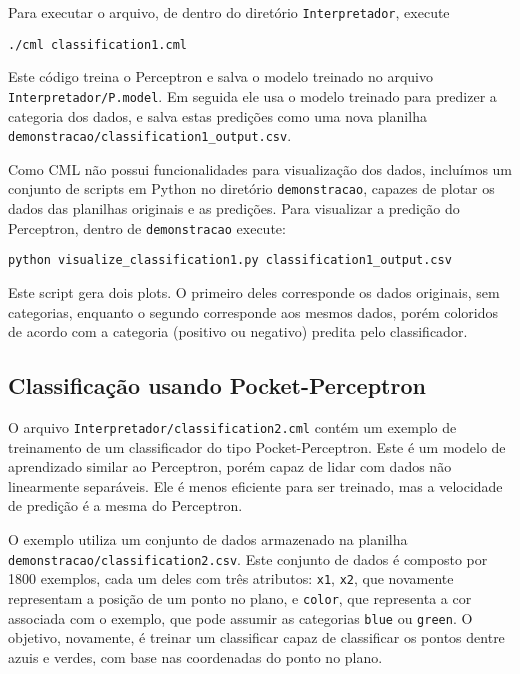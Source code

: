 \documentclass[12pt]{article}
\begin{document}
Para executar o arquivo, de dentro do diretório \texttt{Interpretador}, execute

\begin{verbatim}
./cml classification1.cml
\end{verbatim}

Este código treina o Perceptron e salva o modelo treinado no arquivo \texttt{Interpretador/P.model}. Em seguida ele usa o modelo treinado para predizer a categoria dos dados, e salva estas predições como uma nova planilha \texttt{demonstracao/classification1\_output.csv}.

Como CML não possui funcionalidades para visualização dos dados, incluímos um conjunto de scripts em Python no diretório \texttt{demonstracao}, capazes de plotar os dados das planilhas originais e as predições. Para visualizar a predição do Perceptron, dentro de \texttt{demonstracao} execute:

\begin{verbatim}
python visualize_classification1.py classification1_output.csv
\end{verbatim}

Este script gera dois plots. O primeiro deles corresponde os dados originais, sem categorias, enquanto o segundo corresponde aos mesmos dados, porém coloridos de acordo com a categoria (positivo ou negativo) predita pelo classificador.

\subsection{Classificação usando Pocket-Perceptron}

O arquivo \texttt{Interpretador/classification2.cml} contém um exemplo de treinamento de um classificador do tipo Pocket-Perceptron. Este é um modelo de aprendizado similar ao Perceptron, porém capaz de lidar com dados não linearmente separáveis. Ele é menos eficiente para ser treinado, mas a velocidade de predição é a mesma do Perceptron.

O exemplo utiliza um conjunto de dados armazenado na planilha \texttt{demonstracao/classification2.csv}. Este conjunto de dados é composto por 1800 exemplos, cada um deles com três atributos: \texttt{x1}, \texttt{x2}, que novamente representam a posição de um ponto no plano, e \texttt{color}, que representa a cor associada com o exemplo, que pode assumir as categorias \texttt{blue} ou \texttt{green}. O objetivo, novamente, é treinar um classificar capaz de classificar os pontos dentre azuis e verdes, com base nas coordenadas do ponto no plano. 
\end{document}
